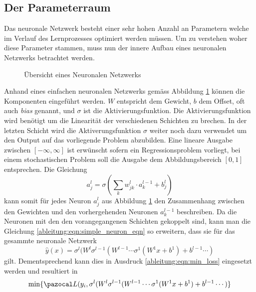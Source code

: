 \subsection{Der Parameterraum}
Das neuronale Netzwerk besteht einer sehr hohen Anzahl an Parametern welche im Verlauf des Lernprozesses optimiert werden müssen. Um zu verstehen woher diese Parameter stammen, muss nun der innere Aufbau eines neuronalen Netzwerks betrachtet werden.
\begin{figure}
	\begin{center}
		
		\caption{Übersicht eines Neuronalen Netzwerks}
		\label{ableitung:fig:neuronal_network}
	\end{center}
\end{figure} 
Anhand eines einfachen neuronalen Netzwerks gemäss Abbildung \ref{ableitung:fig:neuronal_network} können die Komponenten eingeführt werden. $W$ entspricht dem Gewicht, $b$ dem Offset, oft auch \textit{bias} genannt, und $\sigma$ ist die Aktivierungsfunktion. Die Aktivierungsfunktion wird benötigt um die Linearität der verschiedenen Schichten zu brechen. In der letzten Schicht wird die Aktiverungsfunktion $\sigma$ weiter noch dazu verwendet um den Output auf das vorliegende Problem abzubilden. Eine lineare Ausgabe zwischen $[-\infty, \infty]$ ist erwünscht sofern ein Regressionsproblem vorliegt, bei einem stochastischen Problem soll die Ausgabe dem Abbildungsbereich $[0, 1]$ entsprechen. Die Gleichung
\begin{equation}
a^{l}_{j} = \sigma \left( \sum\limits_{k}w^{l}_{jk} \cdot a^{l-1}_{k}+b^{l}_{j} \right)
\label{ableitung:eqn:simple_neuron_eqn}
\end{equation}
kann somit für jedes Neuron $a^{l}_{j}$ aus Abbildung \ref{ableitung:fig:neuronal_network} den Zusammenhang zwischen den Gewichten und den vorhergehenden Neuronen $a^{l-1}_{k}$ beschreiben.
Da die Neuronen mit den den vorangegangenen Schichten gekoppelt sind, kann man die Gleichung \eqref{ableitung:eqn:simple_neuron_eqn} so erweitern, dass sie für das gesammte neuronale Netzwerk
\begin{equation}
\hat{y}(x) = \sigma^{l}(W^{l}\sigma^{l-1}(W^{l-1}\cdots \sigma^{1}(W^{1}x+b^{1}) + b^{l-1} \cdots )
\label{ableitung:eqn:full_net}
\end{equation}
gilt. Dementsprechend kann dies in Ausdruck \eqref{ableitung:eqn:min_loss} eingesetzt werden und resultiert in
\begin{equation}
	\min \{ \Lb(y_{i}, \sigma^{l}(W^{l}\sigma^{l-1}(W^{l-1}\cdots \sigma^{1}(W^{1}x+b^{1}) + b^{l-1} \cdots ) \}
\end{equation}
